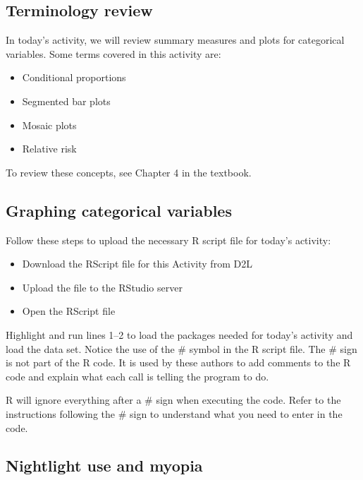 \documentclass[
]{report}
\begin{document}
\subsection{Terminology review}\label{terminology-review-15}

In today's activity, we will review summary measures and plots for categorical variables. Some terms covered in this activity are:

\begin{itemize}
\item
  Conditional proportions
\item
  Segmented bar plots
\item
  Mosaic plots
\item
  Relative risk
\end{itemize}

To review these concepts, see Chapter 4 in the textbook.

\subsection{Graphing categorical variables}\label{graphing-categorical-variables}

Follow these steps to upload the necessary R script file for today's activity:

\begin{itemize}
\item
  Download the RScript file for this Activity from D2L
\item
  Upload the file to the RStudio server
\item
  Open the RScript file
\end{itemize}

Highlight and run lines 1--2 to load the packages needed for today's activity and load the data set. Notice the use of the \# symbol in the R script file. The \# sign is not part of the R code. It is used by these authors to add comments to the R code and explain what each call is telling the program to do.

R will ignore everything after a \# sign when executing the code. Refer to the instructions following the \# sign to understand what you need to enter in the code.

\subsection*{Nightlight use and myopia}\label{nightlight-use-and-myopia}
\end{document}
